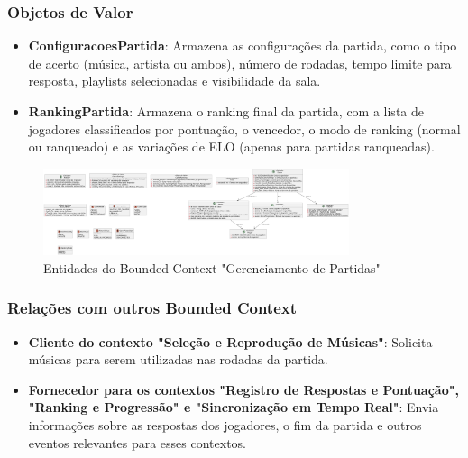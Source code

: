 \subsubsection{Objetos de Valor}
    \begin{itemize}
        \item \textbf{ConfiguracoesPartida}: Armazena as configurações da partida, como o tipo de acerto (música, artista ou ambos), número de rodadas, tempo limite para resposta, playlists selecionadas e visibilidade da sala.
        \item \textbf{RankingPartida}: Armazena o ranking final da partida, com a lista de jogadores classificados por pontuação, o vencedor, o modo de ranking (normal ou ranqueado) e as variações de ELO (apenas para partidas ranqueadas).
    \end{itemize}

    \begin{figure}[H]
        \centering
        \includegraphics[width=0.8\textwidth]{image/entidades_gerenciamento_partida.png}
        \caption{Entidades do Bounded Context "Gerenciamento de Partidas"}
        \label{fig:minha_imagem}
    \end{figure}

\subsubsection{Relações com outros Bounded Context}
    \begin{itemize}
        \item \textbf{Cliente do contexto "Seleção e Reprodução de Músicas"}: Solicita músicas para serem utilizadas nas rodadas da partida.
        \item \textbf{Fornecedor para os contextos "Registro de Respostas e Pontuação", "Ranking e Progressão" e "Sincronização em Tempo Real"}: Envia informações sobre as respostas dos jogadores, o fim da partida e outros eventos relevantes para esses contextos.
    \end{itemize}








